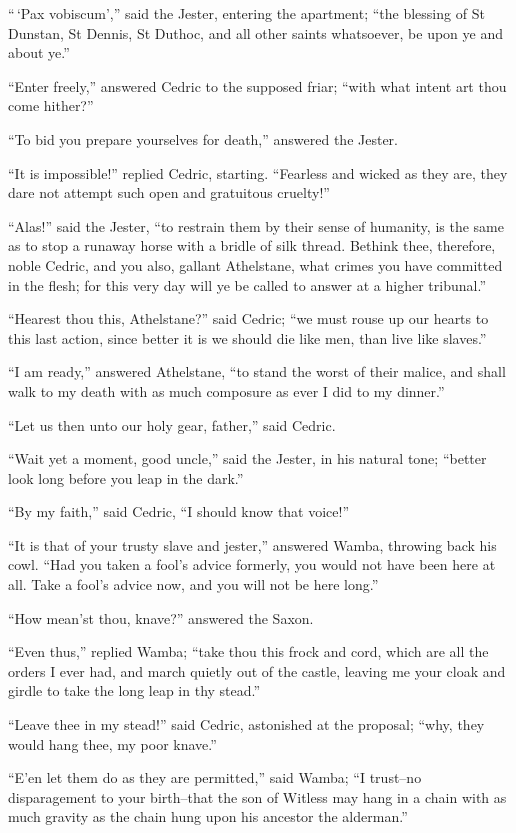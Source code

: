 ``\,`Pax vobiscum','' said the Jester, entering the apartment; ``the
blessing of St Dunstan, St Dennis, St Duthoc, and all other saints
whatsoever, be upon ye and about ye.''

``Enter freely,'' answered Cedric to the supposed friar; ``with what
intent art thou come hither?''

``To bid you prepare yourselves for death,'' answered the Jester.

``It is impossible!'' replied Cedric, starting. ``Fearless and wicked as
they are, they dare not attempt such open and gratuitous cruelty!''

``Alas!'' said the Jester, ``to restrain them by their sense of
humanity, is the same as to stop a runaway horse with a bridle of silk
thread. Bethink thee, therefore, noble Cedric, and you also, gallant
Athelstane, what crimes you have committed in the flesh; for this very
day will ye be called to answer at a higher tribunal.''

``Hearest thou this, Athelstane?'' said Cedric; ``we must rouse up our
hearts to this last action, since better it is we should die like men,
than live like slaves.''

``I am ready,'' answered Athelstane, ``to stand the worst of their
malice, and shall walk to my death with as much composure as ever I did
to my dinner.''

``Let us then unto our holy gear, father,'' said Cedric.

``Wait yet a moment, good uncle,'' said the Jester, in his natural tone;
``better look long before you leap in the dark.''

``By my faith,'' said Cedric, ``I should know that voice!''

``It is that of your trusty slave and jester,'' answered Wamba, throwing
back his cowl. ``Had you taken a fool's advice formerly, you would not
have been here at all. Take a fool's advice now, and you will not be
here long.''

``How mean'st thou, knave?'' answered the Saxon.

``Even thus,'' replied Wamba; ``take thou this frock and cord, which are
all the orders I ever had, and march quietly out of the castle, leaving
me your cloak and girdle to take the long leap in thy stead.''

``Leave thee in my stead!'' said Cedric, astonished at the proposal;
``why, they would hang thee, my poor knave.''

``E'en let them do as they are permitted,'' said Wamba; ``I trust--no
disparagement to your birth--that the son of Witless may hang in a chain
with as much gravity as the chain hung upon his ancestor the alderman.''

